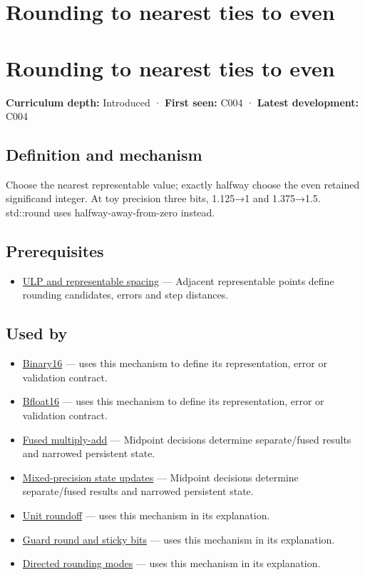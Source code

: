 \hypertarget{appendix-614afe1de592}{}
\section*{Rounding to nearest ties to even}
\section{Rounding to nearest ties to even}\label{rounding-to-nearest-ties-to-even}

\textbf{Curriculum depth:} Introduced · \textbf{First seen:} C004 · \textbf{Latest development:} C004

\subsection{Definition and mechanism}\label{definition-and-mechanism}

Choose the nearest representable value; exactly halfway choose the even retained significand integer. At toy precision three bits, 1.125→1 and 1.375→1.5. std::round uses halfway-away-from-zero instead.

\subsection{Prerequisites}\label{prerequisites}

\begin{itemize}
\tightlist
\item
  \hyperref[appendix-14bab4cab9d4]{ULP and representable spacing} --- Adjacent representable points define rounding candidates, errors and step distances.
\end{itemize}

\subsection{Used by}\label{used-by}

\begin{itemize}
\item
  \hyperref[appendix-34443cec7170]{Binary16} --- uses this mechanism to define its representation, error or validation contract.
\item
  \hyperref[appendix-18b8dd966b5d]{Bfloat16} --- uses this mechanism to define its representation, error or validation contract.
\item
  \hyperref[appendix-41e8ef22a21e]{Fused multiply-add} --- Midpoint decisions determine separate/fused results and narrowed persistent state.
\item
  \hyperref[appendix-260182e617b7]{Mixed-precision state updates} --- Midpoint decisions determine separate/fused results and narrowed persistent state.
\item
  \hyperref[appendix-bc44f7b42f42]{Unit roundoff} --- uses this mechanism in its explanation.
\item
  \hyperref[appendix-b572b631069b]{Guard round and sticky bits} --- uses this mechanism in its explanation.
\item
  \hyperref[appendix-637d164ae5ca]{Directed rounding modes} --- uses this mechanism in its explanation.
\end{itemize}

